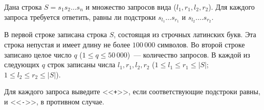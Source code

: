 Дана строка $S = s_1s_2 \ldots s_n$ и множество запросов вида ($l_1, r_1,
 l_2, r_2$). Для каждого запроса требуется ответить, равны ли подстроки
 $s_{l_1} \ldots s_{r_1}$ и $s_{l_2}. \ldots s_{r_2}$.
 
\InputFile

В первой строке записана строка $S$, состоящая из строчных латинских букв.
Эта строка непустая и имеет длину не более $100\,000$ символов. Во второй
строке записано целое число $q$ ($1 \le q \le 50\,000$)~---
 количество запросов. В каждой из следующих $q$ строк записаны числа
 $l_1, r_1, l_2, r_2$ ($1 \le l_1 \le r_1 \le |S|$; $1 \le l_2 \le r_2 
 \le |S|$).

\OutputFile
Для каждого запроса выведите <<\texttt{+}>>, если соответствующие
подстроки равны, и <<\texttt{-}>>, в противном случае.

